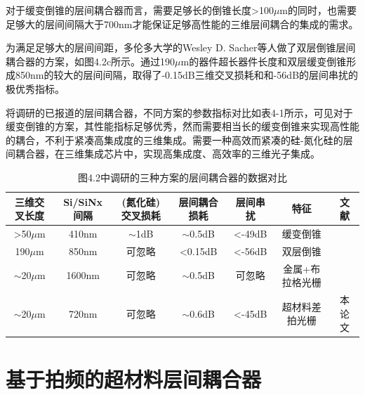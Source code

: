 对于缓变倒锥的层间耦合器而言，需要足够长的倒锥长度>100$\mu$m的同时，也需要足够大的层间间隔大于700nm才能保证足够高性能的三维层间耦合的集成的需求。

为满足足够大的层间间距，多伦多大学的Wesley D. Sacher等人做了双层倒锥层间耦合器的方案，如图4.2c所示。通过190$\mu$m的器件超长器件长度和双层缓变倒锥形成850nm的较大的层间间隔，取得了-0.15dB三维交叉损耗和和-56dB的层间串扰的极优秀指标。 \cite{Sacher:17}

将调研的已报道的层间耦合器，不同方案的参数指标对比如表4-1所示，可见对于缓变倒锥的方案，其性能指标足够优秀，然而需要相当长的缓变倒锥来实现高性能的耦合，不利于紧凑高集成度的三维集成。需要一种高效而紧凑的硅-氮化硅的层间耦合器，在三维集成芯片中，实现高集成度、高效率的三维光子集成。


\begin{table}[!htbp]
    \caption{图4.2中调研的三种方案的层间耦合器的数据对比}
    \label{tab:5}
    \centering
    \footnotesize%
    \setlength{\tabcolsep}{4pt}%
    \renewcommand{\arraystretch}{1.2}%
\begin{tabular}{ccccccc}
三维交叉长度             & Si/SiNx间隔 & (氮化硅)交叉损耗 & 层间耦合损耗            & 层间串扰             & 特征                              & 文献       \\ \hline
\textgreater{}50$\mu$m & 410nm     & $\sim$1dB & $\sim$0.5dB       & \textless{}-49dB & {\color[HTML]{FE0000} 缓变倒锥}     & \cite{Majid2014High} \\
190$\mu$m              & 850nm     & 可忽略       & \textless{}0.15dB & \textless{}-56dB & {\color[HTML]{FE0000} 双层倒锥}     & \cite{Jones2013Ultra} \\
$\sim$20$\mu$m         & 1600nm    & 可忽略       & $\sim$0.5dB       & 可忽略              & {\color[HTML]{FE0000} 金属+布拉格光栅} & \cite{Sacher:17} \\
$\sim$20$\mu$m         & 720nm     & 可忽略       & $\sim$0.6dB       & \textless{}-45dB & {\color[HTML]{FE0000} 超材料差拍光栅}  & 本论文     
\end{tabular}
\end{table}

\section{基于拍频的超材料层间耦合器}

